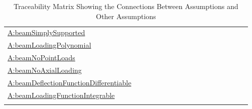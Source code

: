 \documentclass[12pt]{article}
\begin{document}
\begin{longtable}{l l l l l l l l l l l l l l l l l}
\\
\hyperref[beamSimplySupported]{A:beamSimplySupported} &  &  &  &  &  &  &  &  &  &  &  &  &  &  &  & 
\\
\hyperref[beamLoadingPolynomial]{A:beamLoadingPolynomial} &  &  &  &  &  &  &  &  &  &  &  &  &  &  &  & 
\\
\hyperref[beamNoPointLoads]{A:beamNoPointLoads} &  &  &  &  &  &  &  &  &  &  &  &  &  &  &  & 
\\
\hyperref[beamNoAxialLoading]{A:beamNoAxialLoading} &  &  &  &  &  &  &  &  &  &  &  &  &  &  &  & 
\\
\hyperref[beamDeflectionFunctionDifferentiable]{A:beamDeflectionFunctionDifferentiable} &  &  &  &  &  &  &  &  &  &  &  &  &  &  &  & 
\\
\hyperref[beamLoadingFunctionIntegrable]{A:beamLoadingFunctionIntegrable} &  &  &  &  &  &  &  &  &  &  &  &  &  &  &  & 
\\
\bottomrule
\caption{Traceability Matrix Showing the Connections Between Assumptions and Other Assumptions}
\label{Table:TraceMatAvsA}
\end{longtable}
\end{document}
